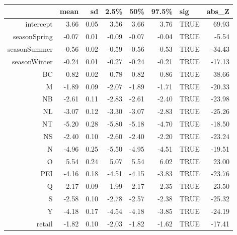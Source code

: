 \begin{table}[ht]
\centering
\begin{tabular}{rrrrrrlr}
  \hline
 & mean & sd & 2.5\% & 50\% & 97.5\% & sig & abs\_Z \\ 
  \hline
intercept & 3.66 & 0.05 & 3.56 & 3.66 & 3.76 & TRUE & 69.93 \\ 
  seasonSpring & -0.07 & 0.01 & -0.09 & -0.07 & -0.04 & TRUE & -5.54 \\ 
  seasonSummer & -0.56 & 0.02 & -0.59 & -0.56 & -0.53 & TRUE & -34.43 \\ 
  seasonWinter & -0.24 & 0.01 & -0.27 & -0.24 & -0.21 & TRUE & -17.13 \\ 
  BC & 0.82 & 0.02 & 0.78 & 0.82 & 0.86 & TRUE & 38.66 \\ 
  M & -1.89 & 0.09 & -2.07 & -1.89 & -1.71 & TRUE & -20.33 \\ 
  NB & -2.61 & 0.11 & -2.83 & -2.61 & -2.40 & TRUE & -23.98 \\ 
  NL & -3.07 & 0.12 & -3.30 & -3.07 & -2.83 & TRUE & -25.26 \\ 
  NT & -5.20 & 0.28 & -5.80 & -5.18 & -4.70 & TRUE & -18.50 \\ 
  NS & -2.40 & 0.10 & -2.60 & -2.40 & -2.20 & TRUE & -23.24 \\ 
  N & -4.96 & 0.25 & -5.50 & -4.95 & -4.51 & TRUE & -19.51 \\ 
  O & 5.54 & 0.24 & 5.07 & 5.54 & 6.02 & TRUE & 23.00 \\ 
  PEI & -4.16 & 0.18 & -4.51 & -4.15 & -3.83 & TRUE & -23.76 \\ 
  Q & 2.17 & 0.09 & 1.99 & 2.17 & 2.35 & TRUE & 23.50 \\ 
  S & -2.58 & 0.10 & -2.78 & -2.57 & -2.38 & TRUE & -25.32 \\ 
  Y & -4.18 & 0.17 & -4.54 & -4.18 & -3.85 & TRUE & -24.19 \\ 
  retail & -1.82 & 0.10 & -2.03 & -1.82 & -1.62 & TRUE & -17.41 \\ 
   \hline
\end{tabular}
\end{table}
